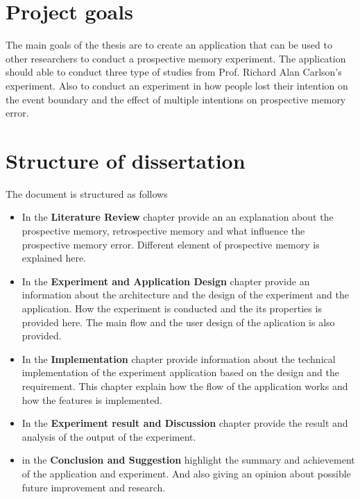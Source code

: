 \section{Project goals}
The main goals of the thesis are to create an application that can be used to other researchers to conduct a prospective memory experiment. The application should able to conduct three type of studies from Prof. Richard Alan Carlson's experiment.
Also to conduct an experiment in how people lost their intention on the event boundary and the effect of multiple intentions on prospective memory error.

\section{Structure of dissertation}

The document is structured as follows
\begin{itemize}
\item In the \textbf{Literature Review} chapter provide an an explanation about the prospective memory, retrospective memory and what influence the prospective memory error.
Different element of prospective memory is explained here.

\item In the \textbf{Experiment and Application Design} chapter provide an information about the architecture and the design of the experiment and the application.
How the experiment is conducted and the its properties is provided here. The main flow and the user design of the aplication is also provided.

\item In the \textbf{Implementation} chapter provide information about the technical implementation of the experiment application based on the design and the requirement. This chapter explain how the flow of the application works and how the features is implemented.

\item In the \textbf{Experiment result and Discussion} chapter provide the result and analysis of the output of the experiment.

\item in the \textbf{Conclusion and Suggestion} highlight the summary and achievement of the application and experiment. And also giving an opinion about possible future improvement and research.


\end{itemize}
